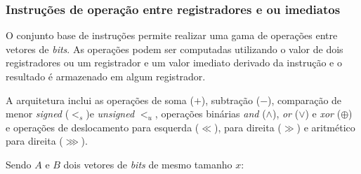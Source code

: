\subsubsection{Instruções de operação entre registradores e ou imediatos}
\label{ssec:regimm}

    O conjunto base de instruções permite realizar uma gama de operações entre vetores de \emph{bits}. As operações podem ser
    computadas utilizando o valor de dois registradores ou um registrador e um valor imediato derivado da instrução e o resultado
    é armazenado em algum registrador.

    A arquitetura inclui as operações de soma ($+$), subtração ($-$), comparação de menor \emph{signed} ($<_s$)e \emph{unsigned} $<_u$,
    operações binárias \emph{and} ($\land$), \emph{or} ($\lor$) e \emph{xor} ($\oplus$) e operações de deslocamento para esquerda
    ($\ll$), para direita ($\gg$) e aritmético para direita ($\ggg$).

    Sendo $A$ e $B$ dois vetores de \emph{bits} de mesmo tamanho $x$:

